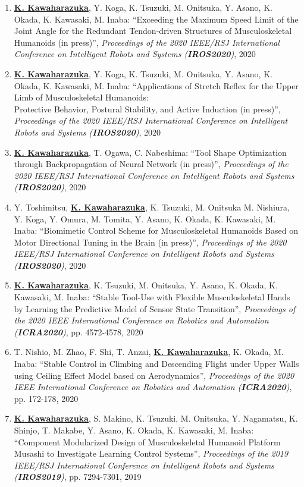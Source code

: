 \documentclass[letterpaper]{article}
\begin{document}
\begin{enumerate}
\item \underline{\textbf{K. Kawaharazuka}}, Y. Koga, K. Tsuzuki, M. Onitsuka, Y. Asano, K. Okada, K. Kawasaki, M. Inaba: ``Exceeding the Maximum Speed Limit of the Joint Angle for the Redundant Tendon-driven Structures of Musculoskeletal Humanoids (in press)'', \textit{Proceedings of the 2020 IEEE/RSJ International Conference on Intelligent Robots and Systems (\textit{\textbf{IROS2020}})}, 2020
\item \underline{\textbf{K. Kawaharazuka}}, Y. Koga, K. Tsuzuki, M. Onitsuka, Y. Asano, K. Okada, K. Kawasaki, M. Inaba: ``Applications of Stretch Reflex for the Upper Limb of Musculoskeletal Humanoids:\\Protective Behavior, Postural Stability, and Active Induction (in press)'', \textit{Proceedings of the 2020 IEEE/RSJ International Conference on Intelligent Robots and Systems (\textit{\textbf{IROS2020}})}, 2020
\item \underline{\textbf{K. Kawaharazuka}}, T. Ogawa, C. Nabeshima: ``Tool Shape Optimization through Backpropagation of Neural Network (in press)'', \textit{Proceedings of the 2020 IEEE/RSJ International Conference on Intelligent Robots and Systems (\textit{\textbf{IROS2020}})}, 2020
\item Y. Toshimitsu, \underline{\textbf{K. Kawaharazuka}}, K. Tsuzuki, M. Onitsuka M. Nishiura, Y. Koga, Y. Omura, M. Tomita, Y. Asano, K. Okada, K. Kawasaki, M. Inaba: ``Biomimetic Control Scheme for Musculoskeletal Humanoids Based on Motor Directional Tuning in the Brain (in press)'', \textit{Proceedings of the 2020 IEEE/RSJ International Conference on Intelligent Robots and Systems (\textit{\textbf{IROS2020}})}, 2020
\item \underline{\textbf{K. Kawaharazuka}}, K. Tsuzuki, M. Onitsuka, Y. Asano, K. Okada, K. Kawasaki, M. Inaba: ``Stable Tool-Use with Flexible Musculoskeletal Hands by Learning the Predictive Model of Sensor State Transition'', \textit{Proceedings of the 2020 IEEE International Conference on Robotics and Automation (\textit{\textbf{ICRA2020}})}, pp. 4572-4578, 2020
\item T. Nishio, M. Zhao, F. Shi, T. Anzai, \underline{\textbf{K. Kawaharazuka}}, K. Okada, M. Inaba: ``Stable Control in Climbing and Descending Flight under Upper Walls using Ceiling Effect Model based on Aerodynamics'', \textit{Proceedings of the 2020 IEEE International Conference on Robotics and Automation (\textit{\textbf{ICRA2020}})}, pp. 172-178, 2020
\item \underline{\textbf{K. Kawaharazuka}}, S. Makino, K. Tsuzuki, M. Onitsuka, Y. Nagamatsu, K. Shinjo, T. Makabe, Y. Asano, K. Okada, K. Kawasaki, M. Inaba: ``Component Modularized Design of Musculoskeletal Humanoid Platform Musashi to Investigate Learning Control Systems'', \textit{Proceedings of the 2019 IEEE/RSJ International Conference on Intelligent Robots and Systems (\textit{\textbf{IROS2019}})}, pp. 7294-7301, 2019

\end{enumerate}
\end{document}
